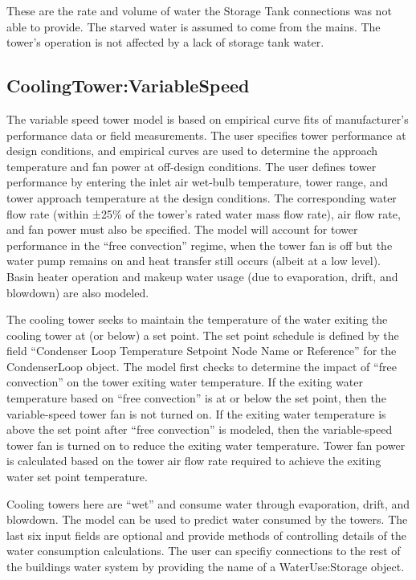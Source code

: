 These are the rate and volume of water the Storage Tank connections was not able to provide. The starved water is assumed to come from the mains. The tower's operation is not affected by a lack of storage tank water.

\subsection{CoolingTower:VariableSpeed}\label{coolingtowervariablespeed}

The variable speed tower model is based on empirical curve fits of manufacturer's performance data or field measurements. The user specifies tower performance at design conditions, and empirical curves are used to determine the approach temperature and fan power at off-design conditions. The user defines tower performance by entering the inlet air wet-bulb temperature, tower range, and tower approach temperature at the design conditions. The corresponding water flow rate (within ±25\% of the tower's rated water mass flow rate), air flow rate, and fan power must also be specified. The model will account for tower performance in the ``free convection'' regime, when the tower fan is off but the water pump remains on and heat transfer still occurs (albeit at a low level). Basin heater operation and makeup water usage (due to evaporation, drift, and blowdown) are also modeled.

The cooling tower seeks to maintain the temperature of the water exiting the cooling tower at (or below) a set point. The set point schedule is defined by the field ``Condenser Loop Temperature Setpoint Node Name or Reference'' for the CondenserLoop object. The model first checks to determine the impact of ``free convection'' on the tower exiting water temperature. If the exiting water temperature based on ``free convection'' is at or below the set point, then the variable-speed tower fan is not turned on. If the exiting water temperature is above the set point after ``free convection'' is modeled, then the variable-speed tower fan is turned on to reduce the exiting water temperature. Tower fan power is calculated based on the tower air flow rate required to achieve the exiting water set point temperature.

Cooling towers here are ``wet'' and consume water through evaporation, drift, and blowdown. The model can be used to predict water consumed by the towers. The last six input fields are optional and provide methods of controlling details of the water consumption calculations. The user can specifiy connections to the rest of the buildings water system by providing the name of a WaterUse:Storage object.

